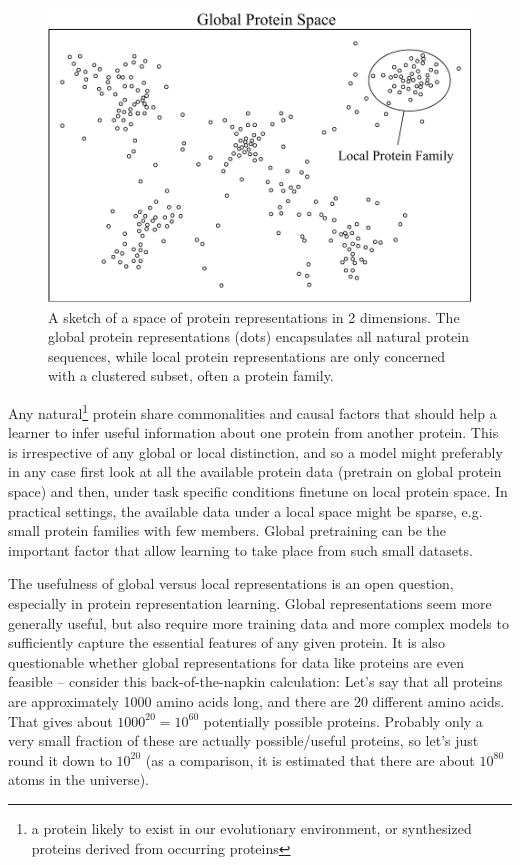 \begin{figure}[ht]
    \centering
    \includegraphics[scale = 0.8]{report/figures/protein_global_local.pdf}
    \caption{A sketch of a space of protein representations in 2 dimensions. The global protein representations (dots) encapsulates all natural protein sequences, while local protein representations are only concerned with a clustered subset, often a protein family.}
    \label{fig:global_local}
\end{figure}

Any natural\footnote{a protein likely to exist in our evolutionary environment, or synthesized proteins derived from occurring proteins} protein share commonalities and causal factors that should help a learner to infer useful information about one protein from another protein. This is irrespective of any global or local distinction, and so a model might preferably in any case first look at all the available protein data (pretrain on global protein space) and then, under task specific conditions finetune on local protein space. In practical settings, the available data under a local space might be sparse, e.g. small protein families with few members. Global pretraining can be the important factor that allow learning to take place from such small datasets.

The usefulness of global versus local representations is an open question, especially in protein representation learning. Global representations seem more generally useful, but also require more training data and more complex models to sufficiently capture the essential features of any given protein. It is also questionable whether global representations for data like proteins are even feasible -- consider this back-of-the-napkin calculation: Let's say that all proteins are approximately 1000 amino acids long, and there are 20 different amino acids. That gives about $1000^{20} = 10^{60}$ potentially possible proteins. Probably only a very small fraction of these are actually possible/useful proteins, so let's just round it down to $10^{20}$ (as a comparison, it is estimated that there are about $10^{80}$ atoms in the universe).

